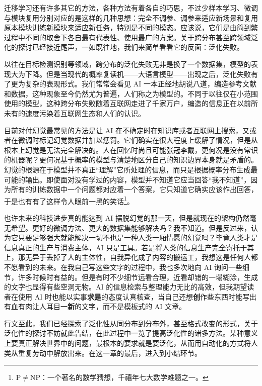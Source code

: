 迁移学习还有许多其它的方法，各种方法有着各自的巧思，不过少样本学习、微调与模块复用分别对应的是这样的几种思想：完全不调参、调参来适应新场景和复用原本模块训练新模块来适应新任务，特别是不同的模态。应该说，它们是由简到繁过程中不同的取舍下各自最有代表性、使用最广的方案。关于跨分布甚至跨领域泛化的探讨已经接近尾声，一如既往地，我们来简单看看它的反面：泛化失败。

以往在目标检测识别等领域，跨分布的泛化失败无非是换了一个数据集，模型的表现大为下降。但是当现代的概率复读机——大语言模型——出现之后，泛化失败有了更为复杂的表现形式。我们常常会看见 AI 一本正经地胡说八道，编造参考文献和数据，这种现象至今仍然尤为普遍，人们称之为模型的。不同于以往仅在小范围使用的模型，这种跨分布失败随着互联网走进了千家万户，编造的信息正在以前所未有的速度污染着互联网生态和人们的认识。

目前对付幻觉最常见的方法是让 AI 在不确定时在知识库或者互联网上搜索，又或者在微调时标记幻觉数据并加以惩罚。它们确实在很大程度上缓解了情况，但是从根本上幻觉是无法完全解决的。人在回忆时尚且可能张冠李戴，更何况是没有常识的机器呢？更何况基于概率的模型与清楚地区分自己的知识边界本身就是矛盾的。幻觉的根源在于模型并不真正“理解”它所处理的信息，而只是根据概率分布生成最可能的输出。即使面对没有学过的内容，模型并不知道它应当回答“我不知道”，因为所有的训练数据中一个问题都对应着一个答案，它只知道它确实应该作出回答，于是也有有了这样令人眼前一黑的笑话\footnote{$\mathrm{P}\ne \mathrm{NP}$：一个著名的数学猜想，千禧年七大数学难题之一。}。

也许未来的科技进步真的能达到 AI 摆脱幻觉的那一天，但是就现在的架构仍然毫无希望。更好的微调方法、更大的数据集能够解决吗？我不知道。但是反过来，认为它只要足够强大就能解决一切不也是一种人类一厢情愿的幻觉吗？毕竟人类才是信息真正的生产与消费主体，AI 只是工具。若是将人类的信息生产完全寄托于其上，那无异于丢掉了人的主体性，自我异化成了内容的搬运工，我想这是任何人都不愿看到的未来。在我自己写这些文字的过程中，我也多次地向 AI 询问一些细节，许多时候时有益的。但是有时不少细节远看合理，近看却错的一塌糊涂，生成的文字也显得有些空洞无物。AI 的信息检索与整理能力无比的高效，但我期望读者在使用 AI 时也能以实事\textbf{求是}的态度认真核查，当自己还想\textbf{创}作些东西时能写出有血有肉让人耳目一\textbf{新}的文字，而不是模板式的 AI 文章。

行文至此，我们已经探索了泛化性从同分布到分布外，甚至格式改变的形式，关于泛化性的探讨不妨就此告结，在此过程中一览了提高泛化性的诸多方法。某种意义上要真正解决世界中的问题，最根本的要求就是要泛化，从而用自动化的方式将人类从重复劳动中解放出来。在这一章的最后，进入到小结环节。

